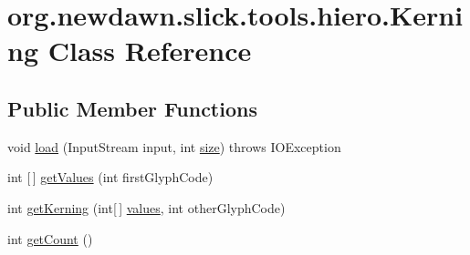 \hypertarget{classorg_1_1newdawn_1_1slick_1_1tools_1_1hiero_1_1_kerning}{}\section{org.\+newdawn.\+slick.\+tools.\+hiero.\+Kerning Class Reference}
\label{classorg_1_1newdawn_1_1slick_1_1tools_1_1hiero_1_1_kerning}
\subsection*{Public Member Functions}
\begin{DoxyCompactItemize}
\item 
void \mbox{\hyperlink{classorg_1_1newdawn_1_1slick_1_1tools_1_1hiero_1_1_kerning_abf8ff328d00ee5187d4146203a84660f}{load}} (Input\+Stream input, int \mbox{\hyperlink{classorg_1_1newdawn_1_1slick_1_1tools_1_1hiero_1_1_kerning_ac5fb2c0fbb7c6ff5bb74545713f197d5}{size}})  throws I\+O\+Exception 
\item 
int \mbox{[}$\,$\mbox{]} \mbox{\hyperlink{classorg_1_1newdawn_1_1slick_1_1tools_1_1hiero_1_1_kerning_aeff28298520b6c43eca3c2031679993c}{get\+Values}} (int first\+Glyph\+Code)
\item 
int \mbox{\hyperlink{classorg_1_1newdawn_1_1slick_1_1tools_1_1hiero_1_1_kerning_ab54e98c75369ce50198fe27f4973a613}{get\+Kerning}} (int\mbox{[}$\,$\mbox{]} \mbox{\hyperlink{classorg_1_1newdawn_1_1slick_1_1tools_1_1hiero_1_1_kerning_a2fb8954e8eb2c071e18a4e14b19ce352}{values}}, int other\+Glyph\+Code)
\item 
int \mbox{\hyperlink{classorg_1_1newdawn_1_1slick_1_1tools_1_1hiero_1_1_kerning_a4b370fa79f600d979db8ea2ee77abbf1}{get\+Count}} ()
\end{DoxyCompactItemize}
